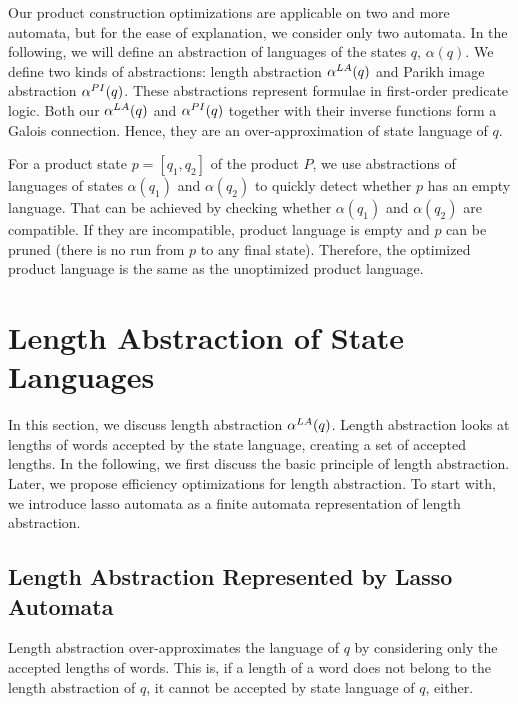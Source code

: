 Our product construction optimizations are applicable on two and more automata, but for the ease of explanation, we consider only two automata. In the following, we will define an abstraction of languages of the states $q$, $\alpha(q)$. We define two kinds of abstractions: length abstraction $\alpha^{LA}(q)$ and Parikh image abstraction $\alpha^{PI}(q)$. These abstractions represent formulae in first-order predicate logic. Both our $\alpha^{LA}(q)$ and $\alpha^{PI}(q)$ together with their inverse functions form a Galois connection. Hence, they are an over-approximation of state language of $q$.

For a product state $p = [q_1, q_2]$ of the product $P$, we use abstractions of languages of states $\alpha(q_1)$ and $\alpha(q_2)$ to quickly detect whether $p$ has an empty language. That can be achieved by checking whether $\alpha(q_1)$ and $\alpha(q_2)$ are compatible. If they are incompatible, product language is empty and $p$ can be pruned (there is no run from $p$ to any final state). Therefore, the optimized product language is the same as the unoptimized product language.


\section{Length Abstraction of State Languages}

In this section, we discuss length abstraction $\alpha^{LA}(q)$. Length abstraction looks at lengths of words accepted by the state language, creating a set of accepted lengths. In the following, we first discuss the basic principle of length abstraction. Later, we propose efficiency optimizations for length abstraction. To start with, we introduce lasso automata as a finite automata representation of length abstraction.

\subsection{Length Abstraction Represented by Lasso Automata} \label{sec:length_abstraction}

Length abstraction over-approximates the language of $q$ by considering only the accepted lengths of words. This is, if a length of a word does not belong to the length abstraction of $q$, it cannot be accepted by state language of $q$, either.

